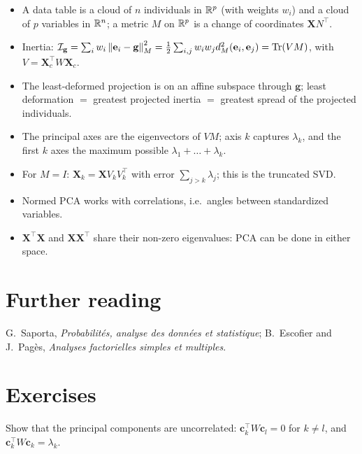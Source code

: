 \begin{notechapter}
\begin{chaptersummary}
\begin{itemize}[nosep]
  \item A data table is a cloud of $n$ individuals in $\mathbb{R}^p$ (with weights $w_i$) and a cloud of $p$
        variables in $\mathbb{R}^n$; a metric $M$ on $\mathbb{R}^p$ is a change of coordinates $\mathbf X N^\top$.
  \item Inertia: $\mathcal I_{\mathbf g} = \sum_iw_i\left\|\mathbf e_i - \mathbf g\right\|_M^2 = \frac12\sum_{i,j}w_iw_jd_M^2(\mathbf e_i,\mathbf e_j) = \operatorname{Tr}(VM)$,
        with $V = \mathbf X_c^\top W\mathbf X_c$.
  \item The least-deformed projection is on an affine subspace through $\mathbf g$; least deformation
        $=$ greatest projected inertia $=$ greatest spread of the projected individuals.
  \item The principal axes are the eigenvectors of $VM$; axis $k$ captures $\lambda_k$, and the first $k$
        axes the maximum possible $\lambda_1 + \dots + \lambda_k$.
  \item For $M = I$: $\hat{\mathbf X}_k = \mathbf XV_kV_k^\top$ with error $\sum_{j>k}\lambda_j$; this is the truncated SVD.
  \item Normed PCA works with correlations, i.e.\ angles between standardized variables.
  \item $\mathbf X^\top\mathbf X$ and $\mathbf X\mathbf X^\top$ share their non-zero eigenvalues: PCA can be done in either space.
\end{itemize}
\end{chaptersummary}

\section*{Further reading}
G.~Saporta, \emph{Probabilit\'es, analyse des donn\'ees et statistique}; B.~Escofier and
J.~Pag\`es, \emph{Analyses factorielles simples et multiples}.

\section*{Exercises}

\begin{exercise}\label{pca-overview:exr:1}
Show that the principal components are uncorrelated: $\mathbf c_k^\top W\mathbf c_l = 0$ for $k\neq l$, and
$\mathbf c_k^\top W\mathbf c_k = \lambda_k$.
\end{exercise}


\end{notechapter}
